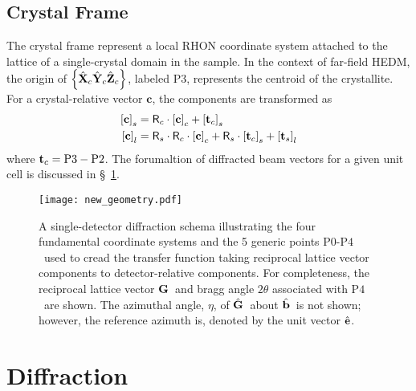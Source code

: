 \documentclass[12pt,letterpaper,final]{amsart}
\newcommand{\mbm}[1]{\ensuremath{\mbox{\boldmath$#1$}}}
\newcommand{\tvecs}{\ensuremath{\mbm{\mathrm{t}}_s}}
\newcommand{\tvecc}{\ensuremath{\mbm{\mathrm{t}}_c}}
\newcommand{\rmats}{\ensuremath{\mathsf{R}_s}}
\newcommand{\rmatc}{\ensuremath{\mathsf{R}_c}}
\newcommand{\gvec}{\ensuremath{\mbm{\mathrm{G}}}}
\newcommand{\ghat}{\ensuremath{\hat{\mbm{\mathrm{G}}}}}
\newcommand{\bhat}{\ensuremath{\hat{\mbm{\mathrm{b}}}}}
\newcommand{\ehat}{\ensuremath{\hat{\mbm{\mathrm{e}}}}}
\newcommand{\Pzero}{\ensuremath{\mathrm{P0}}}
\newcommand{\Ptwo}{\ensuremath{\mathrm{P2}}}
\newcommand{\Pthree}{\ensuremath{\mathrm{P3}}}
\newcommand{\Pfour}{\ensuremath{\mathrm{P4}}}
\newcommand{\Xc}{\ensuremath{\hat{\mbm{\mathrm{X}}}_c}}
\newcommand{\Yc}{\ensuremath{\hat{\mbm{\mathrm{Y}}}_c}}
\newcommand{\Zc}{\ensuremath{\hat{\mbm{\mathrm{Z}}}_c}}
\newcommand{\xtlframe}{\ensuremath{\left\{\Xc\Yc\Zc\right\}}}
\newcommand{\labcomps}[1]{\left[#1\right]_l}
\newcommand{\samcomps}[1]{\left[#1\right]_s}
\newcommand{\xtlcomps}[1]{\left[#1\right]_c}
\newcommand{\secref}[1]{\S~\ref{#1}}
\begin{document}
\subsection{Crystal Frame}\label{S:crystal}
The crystal frame represent a local RHON coordinate system attached to
the lattice of a single-crystal domain in the sample.  In the context
of far-field HEDM, the origin of \xtlframe, labeled \Pthree,
represents the centroid of the crystallite.  For a crystal-relative
vector $\mathbf{c}$, the components are transformed as
\begin{align}
  \samcomps{\mathbf{c}} &= \rmatc\cdot\xtlcomps{\mathbf{c}} + \samcomps{\tvecc}\\
  \labcomps{\mathbf{c}} &= \rmats\cdot\rmatc\cdot\xtlcomps{\mathbf{c}} + \rmats\cdot\samcomps{\tvecc} + \labcomps{\tvecs}
\end{align}
where $\tvecc=\Pthree-\Ptwo$.  The forumaltion of diffracted beam vectors for a given unit cell is discussed in \secref{S:diffraction}.
\begin{figure}[htb]
  \centering
  \texttt{[image: new\_geometry.pdf]}
  \caption{A single-detector diffraction schema illustrating the four fundamental coordinate systems and the 5 generic points \Pzero-\Pfour\ used to cread the transfer function taking reciprocal lattice vector components to detector-relative components.  For completeness, the reciprocal lattice vector \gvec\ and bragg angle $2\theta$ associated with \Pfour\ are shown.  The azimuthal angle, $\eta$, of \ghat\ about \bhat\ is not shown; however, the reference azimuth is, denoted by the unit vector \ehat. }
  \label{F:diffraction_schema}
\end{figure}

\newpage
\section{Diffraction}\label{S:diffraction}
\end{document}
